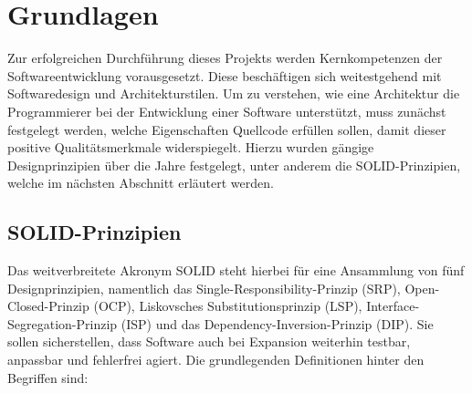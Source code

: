 

\chapter{Grundlagen}

Zur erfolgreichen Durchführung dieses Projekts werden Kernkompetenzen der Softwareentwicklung vorausgesetzt. Diese beschäftigen sich weitestgehend mit Softwaredesign und Architekturstilen. Um zu verstehen, wie eine Architektur die Programmierer bei der Entwicklung einer Software unterstützt, muss zunächst festgelegt werden, welche Eigenschaften Quellcode erfüllen sollen, damit dieser positive Qualitätsmerkmale widerspiegelt. Hierzu wurden gängige Designprinzipien über die Jahre festgelegt, unter anderem die SOLID-Prinzipien, welche im nächsten Abschnitt erläutert werden. %

\section{SOLID-Prinzipien}

Das weitverbreitete Akronym SOLID steht hierbei für eine Ansammlung von fünf Designprinzipien, namentlich das Single-Responsibility-Prinzip (SRP), Open-Closed-Prinzip (OCP), Liskovsches Substitutionsprinzip (LSP), Interface-Segregation-Prinzip (ISP) und das Dependency-Inversion-Prinzip (DIP). Sie sollen sicherstellen, dass Software auch bei Expansion weiterhin testbar, anpassbar und fehlerfrei agiert. Die grundlegenden Definitionen hinter den Begriffen sind:

